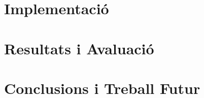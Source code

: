 \documentclass[a4paper,11pt]{book}
\begin{document}
\chapter{Implementació}
\label{ch:implementation}


\chapter{Resultats i Avaluació}
\label{ch:results}


\chapter{Conclusions i Treball Futur}
\label{ch:conclusions}


\backmatter




\end{document}
